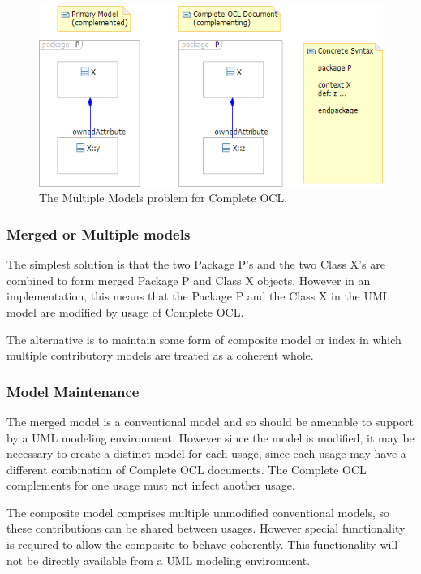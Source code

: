 \documentclass{eceasst}
\begin{document}
\begin{figure}
  \begin{center}
    \includegraphics[width=4.5in]{MultipleModels.png}
  \end{center}
  \caption{The Multiple Models problem for Complete OCL.}
  \label{fig:MultipleModels}
\end{figure}

\subsubsection{Merged or Multiple models}

The simplest solution is that the two Package P's and the two Class X's are combined to form merged Package P and  Class X objects. However in an implementation, this means that the Package P and the Class X in the UML model are modified by usage of Complete OCL.

The alternative is to maintain some form of composite model or index in which multiple contributory models are treated as a coherent whole.

\subsubsection{Model Maintenance}

The merged model is a conventional model and so should be amenable to support by a UML modeling environment. However since the model is modified, it may be necessary to create a distinct model for each usage, since each usage may have a different combination of Complete OCL documents. The Complete OCL complements for one usage must not infect another usage.

The composite model comprises multiple unmodified conventional models, so these contributions can be shared between usages. However special functionality is required to allow the composite to behave coherently. This functionality will not be directly available from a UML modeling environment.
\end{document}
